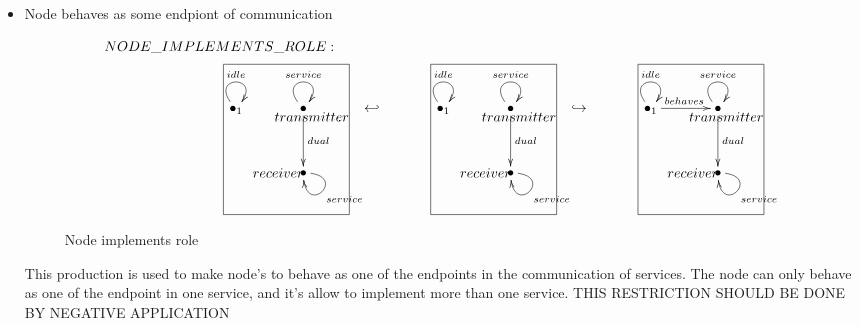 \documentclass[envcountsect,runningheads]{llncs}
\begin{document}
\begin{itemize}
  \item Node behaves as some endpiont of communication
  \begin{figure}[H]
    \[
       \xymatrix@C=35pt@R=35pt
       {
         {}\POS[]-<1pc,0pc>\drop{NODE\_IMPLEMENTS\_ROLE:}
         \\
         {\bullet}_{1} \ar@(ul,ur)^{idle} &
         {\bullet} \ar@(ul,ur)^{service} \ar@{->}^{dual}[d] \POS[]-<-0.5pc,.5pc> \drop{transmitter}
         & {\hookleftarrow} &
         {\bullet}_{1} \ar@(ul,ur)^{idle} &
         {\bullet} \ar@(ul,ur)^{service} \ar@{->}^{dual}[d] \POS[]-<-0.5pc,.5pc> \drop{transmitter}
         & {\hookrightarrow} &
         {\bullet}_{1} \ar@(ul,ur)^{idle}\ar@{->}^{behaves}[r]
         &
         {\bullet} \ar@(ul,ur)^{service} \ar@{->}^{dual}[d] \POS[]-<-0.5pc,.5pc> \drop{transmitter}
         \\
         & {\bullet} \ar@(r,d)^{service} \POS[]-<1.5pc,0pc> \drop{receiver}
         \POS[]+<-1pc,2pc> *+=<7.5pc,9pc>[F-]{} & & &
         {\bullet} \ar@(r,d)^{service} \POS[]-<1.5pc,0pc> \drop{receiver}
         \POS[]+<-1pc,2pc> *+=<7.5pc,9pc>[F-]{} & & &
         {\bullet} \ar@(r,d)^{service} \POS[]-<1.5pc,0pc> \drop{receiver}
         \POS[]+<-1pc,2pc> *+=<7.5pc,9pc>[F-]{}
       }
    \]
    \caption{Node implements role}
    \protect\label{fig:attachmentnodetoservice}
  \end{figure}
  This production is used to make node's to behave as one of the endpoints in 
  the communication of services. The node can only behave as one of the endpoint in 
  one service, and it's allow to implement more than one service.
  THIS RESTRICTION SHOULD BE DONE BY NEGATIVE APPLICATION\\
  

\end{itemize}
\end{document}
